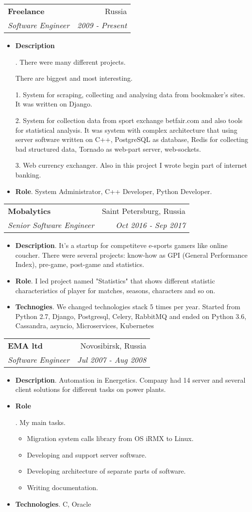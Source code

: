 \documentclass[letterpaper,11pt]{article}
\makeatletter
\newcommand{\resumeItem}[2]{
  \item\small{
    \textbf{#1}{. #2 \vspace{-2pt}}
  }
}
\newcommand{\resumeSubheading}[4]{
  \vspace{-1pt}\item
    \begin{tabular*}{0.97\textwidth}{l@{\extracolsep{\fill}}r}
      \textbf{#1} & #2 \\
      \textit{\small#3} & \textit{\small #4} \\
    \end{tabular*}\vspace{-5pt}
}
\newcommand{\resumeItemListStart}{\begin{itemize}}
\newcommand{\resumeItemListEnd}{\end{itemize}\vspace{-5pt}}
\makeatother
\begin{document}
    \resumeSubheading
      {Freelance}{Russia}
      {Software Engineer}{2009 - Present}
      \resumeItemListStart
        \resumeItem{Description}
          {There were many different projects.

           There are biggest and most interesting.
          
          1. System for scraping, collecting and analysing data from bookmaker's sites. It was written on Django.
          
          2. System for collection data from sport exchange betfair.com and also tools for statistical analysis. It was system with complex architecture that using server software written on C++, PostgreSQL as database, Redis for collecting bad structured data, Tornado as web-part server, web-sockets.

          3. Web currency exchanger. Also in this project I wrote begin part of internet banking.}
        \resumeItem{Role}
          {System Administrator, C++ Developer, Python Developer.}
      \resumeItemListEnd

    \resumeSubheading
      {Mobalytics}{Saint Petersburg, Russia}
      {Senior Software Engineer}{Oct 2016 - Sep 2017}
      \resumeItemListStart
        \resumeItem{Description}
          {It's a startup for competiteve e-sports gamers like online coucher. There were several projects: know-how as GPI (General Performance Index), pre-game, post-game and statistics.}
	\resumeItem{Role}
	  {I led project named "Statistics" that shows different statistic characteristics of player for matches, seasons, characters and so on.}
        \resumeItem{Technogies}
	  {We changed technologies stack 5 times per year. Started from Python 2.7, Django, Postgresql, Celery, RabbitMQ and ended on Python 3.6, Cassandra, asyncio, Microservices, Kubernetes}
      \resumeItemListEnd

     \resumeSubheading
      {EMA ltd}{Novosibirsk, Russia}
      {Software Engineer} {Jul 2007 - Aug 2008}
      \resumeItemListStart
        \resumeItem{Description}
          {Automation in Energetics. Company had 14 server and several client solutions for different tasks on power plants.}
        \resumeItem{Role}
          {My main tasks.
            \begin{itemize}
	   \item Migration system calls library from OS iRMX to Linux.
              \item Developing and support server software.
              \item Developing architecture of separate parts of software.
              \item Writing documentation.
            \end{itemize}
          }
        \resumeItem{Technologies}
          {C, Oracle}
      \resumeItemListEnd
\end{document}
